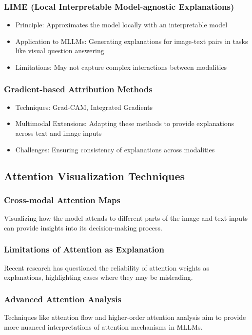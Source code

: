 \subsubsection{LIME (Local Interpretable Model-agnostic Explanations)}
\begin{itemize}
    \item Principle: Approximates the model locally with an interpretable model
    \item Application to MLLMs: Generating explanations for image-text pairs in tasks like visual question answering
    \item Limitations: May not capture complex interactions between modalities
\end{itemize}

\subsubsection{Gradient-based Attribution Methods}
\begin{itemize}
    \item Techniques: Grad-CAM, Integrated Gradients
    \item Multimodal Extensions: Adapting these methods to provide explanations across text and image inputs
    \item Challenges: Ensuring consistency of explanations across modalities
\end{itemize}

\subsection{Attention Visualization Techniques}
\subsubsection{Cross-modal Attention Maps}
Visualizing how the model attends to different parts of the image and text inputs can provide insights into its decision-making process.

\subsubsection{Limitations of Attention as Explanation}
Recent research has questioned the reliability of attention weights as explanations, highlighting cases where they may be misleading.

\subsubsection{Advanced Attention Analysis}
Techniques like attention flow and higher-order attention analysis aim to provide more nuanced interpretations of attention mechanisms in MLLMs.

